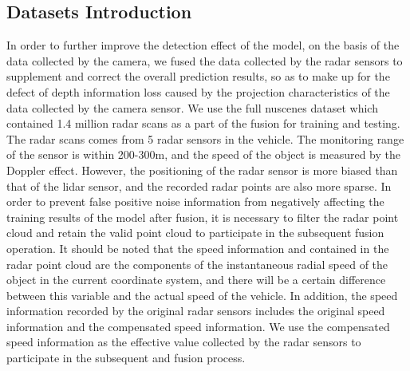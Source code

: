 \documentclass[10pt,twocolumn,letterpaper]{article}
\begin{document}
\subsection{Datasets Introduction}
In order to further improve the detection effect of the model, on the basis of the data collected by the camera, we fused the data collected by the radar sensors to supplement and correct the overall prediction results, so as to make up for the defect of depth information loss caused by the projection characteristics of the data collected by the camera sensor. We use the full nuscenes dataset which contained 1.4 million radar scans as a part of the fusion for training and testing. The radar scans comes from 5 radar sensors in the vehicle. The monitoring range of the sensor is within 200-300m, and the speed of the object is measured by the Doppler effect. However, the positioning of the radar sensor is more biased than that of the lidar sensor, and the recorded radar points are also more sparse\cite{caesar2020nuscenes}. In order to prevent false positive noise information from negatively affecting the training results of the model after fusion, it is necessary to filter the radar point cloud and retain the valid point cloud to participate in the subsequent fusion operation. It should be noted that the speed information  and   contained in the radar point cloud are the components  of the instantaneous radial speed of the object in the current coordinate system, and there will be a certain difference between this variable and the actual speed of the vehicle\cite{nabati2021centerfusion}. In addition, the speed information recorded by the original radar sensors includes the original speed information and the compensated speed information. We use the compensated speed information as the effective value collected by the radar sensors to participate in the subsequent and fusion process.
\end{document}
